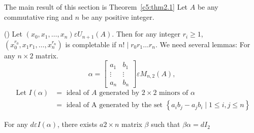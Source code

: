 The main result of this section is Theorem~\ref{c5:thm2.1} Let $A$ be
any commutative ring and $n$ be any positive integer.

\begin{thm}(\citet{Suslinc})\label{c5:thm2.1}
Let $(x_0,x_1,\ldots,x_n)\varepsilon U_{n+1}(A)$. Then for any integer
$r_i\geq 1$, $\left(x_0^{r_0},x_1r_1,\ldots,x^{r_n}_n\right)$ is
completable if $n!\mid r_0r_1\ldots r_n$. We need several lemmas: For
any $n\times 2$ matrix.
$$
\alpha=
\begin{bmatrix}
a_1 & b_1\\
\vdots & \vdots\\
a_n & b_n
\end{bmatrix} \varepsilon M_{n,2}(A),
$$
\begin{align*}
\text{ Let } I(\alpha)&= \text{ ideal of }  A \text{ generated by }
2\times 2 \text{ minors of }
\alpha\\
&=\text{ ideal of A generated by the set } \left\{a_ib_j -a_jb_i\mid
1\leq i,j\leq n\right\}
\end{align*}
\end{thm}

\begin{lem}\label{c5:lem2.2}
For any $d\varepsilon I(\alpha)$, there exists $a2\times n$ matrix
$\beta$ such that $\beta\alpha=dI_2$
\end{lem}

